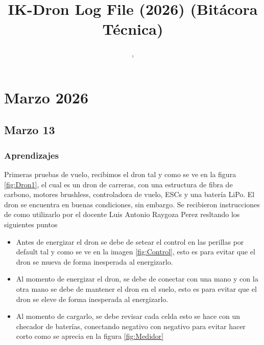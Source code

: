 \documentclass[pdflatex,sn-mathphys-num]{sn-jnl}%
\begin{document}
\title[Article Title]{IK-Dron Log File (2026) (Bitácora Técnica)}

\author{ ,  }









\maketitle
\newpage
\tableofcontents
\newpage

\section{Marzo 2026}
\subsection{Marzo 13 \label{sec:3-13}}
\subsubsection{Aprendizajes}
Primeras pruebas de vuelo, recibimos el dron tal y como se ve en la figura
\ref{fig:Dron1}, el cual es un dron de carreras, con una estructura de fibra de carbono, motores brushless, controladora de vuelo, ESCs y una batería LiPo. El dron se encuentra en buenas condiciones, sin embargo.
Se recibieron instrucciones de como utilizarlo por el docente Luis Antonio Raygoza Perez resltando los siguientes puntos
\begin{itemize}
    \item Antes de energizar el dron se debe de setear el control en las perillas por default tal y como se ve en la imagen \ref{fig:Control}, esto es para evitar que el dron se mueva de forma inesperada al energizarlo.
    \item Al momento de energizar el dron, se debe de conectar con una mano y con la otra mano se debe de mantener el dron en el suelo, esto es para evitar que el dron se eleve de forma inesperada al energizarlo.
    \item Al momento de cargarlo, se debe revisar cada celda esto se hace con un checador de baterías, conectando negativo con negativo para evitar hacer corto como se aprecia en la figura \ref{fig:Medidor}
\end{itemize}
\end{document}
